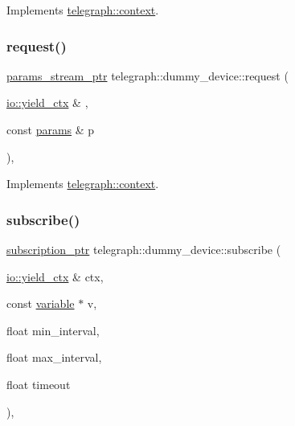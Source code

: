 Implements \hyperlink{classtelegraph_1_1context_a34793623d2a2def580ad0b8710c74c6d}{telegraph\+::context}.

\mbox{\label{classtelegraph_1_1dummy__device_a46d728506b36e9e8b5b6939eb6aefe12}} 
\subsubsection{\texorpdfstring{request()}{request()}}
{\footnotesize\ttfamily \hyperlink{namespacetelegraph_ad071241508ea0f86c7de0686016f9ca9}{params\+\_\+stream\+\_\+ptr} telegraph\+::dummy\+\_\+device\+::request (\begin{DoxyParamCaption}\item[{\hyperlink{structboost_1_1asio_1_1yield__ctx}{io\+::yield\+\_\+ctx} \&}]{,  }\item[{const \hyperlink{classtelegraph_1_1params}{params} \&}]{p }\end{DoxyParamCaption})\hspace{0.3cm}{\ttfamily [override]}, {\ttfamily [virtual]}}



Implements \hyperlink{classtelegraph_1_1context_a6765d7fa22fe99b9a6723c511396b781}{telegraph\+::context}.

\mbox{\label{classtelegraph_1_1dummy__device_a06470ed069c481e8199dce9387448c8b}} 
\subsubsection{\texorpdfstring{subscribe()}{subscribe()}\hspace{0.1cm}{\footnotesize\ttfamily [1/2]}}
{\footnotesize\ttfamily \hyperlink{namespacetelegraph_a58641aa5b1a2cbdb0431916a87069f64}{subscription\+\_\+ptr} telegraph\+::dummy\+\_\+device\+::subscribe (\begin{DoxyParamCaption}\item[{\hyperlink{structboost_1_1asio_1_1yield__ctx}{io\+::yield\+\_\+ctx} \&}]{ctx,  }\item[{const \hyperlink{classtelegraph_1_1variable}{variable} $\ast$}]{v,  }\item[{float}]{min\+\_\+interval,  }\item[{float}]{max\+\_\+interval,  }\item[{float}]{timeout }\end{DoxyParamCaption})\hspace{0.3cm}{\ttfamily [override]}, {\ttfamily [virtual]}}



